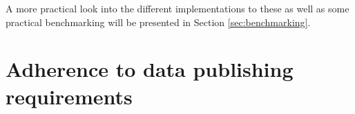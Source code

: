 A more practical look into the different implementations to these as well as
some practical benchmarking will be presented in Section \ref{sec:benchmarking}.

\section{Adherence to data publishing requirements}

